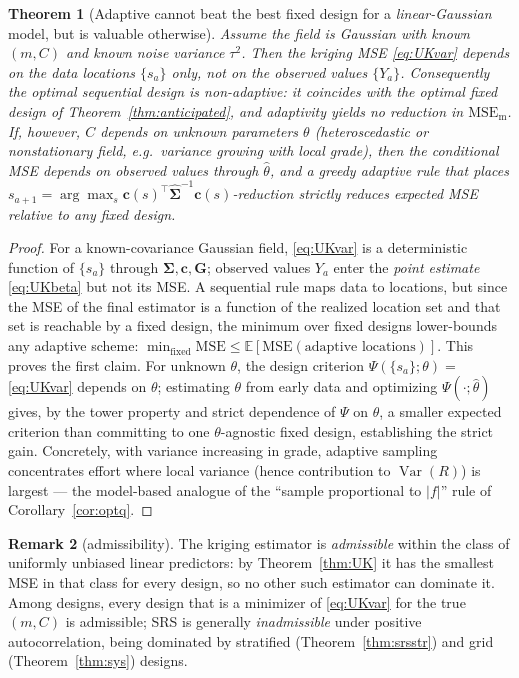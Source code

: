 \documentclass{amsart}
\newtheorem{theorem}{Theorem}
\theoremstyle{definition}
\newtheorem{remark}[theorem]{Remark}
\newcommand{\E}{\mathbb{E}}
\newcommand{\Var}{\operatorname{Var}}
\begin{document}
\begin{theorem}[Adaptive cannot beat the best fixed design for a
\emph{linear-Gaussian} model, but is valuable otherwise]
\label{thm:adaptive}
Assume the field is Gaussian with known $(m,C)$ and known noise variance
$\tau^2$. Then the kriging MSE \eqref{eq:UKvar} depends on the data
locations $\{s_a\}$ \emph{only}, not on the observed values $\{Y_a\}$.
Consequently the optimal sequential design is \emph{non-adaptive}: it
coincides with the optimal fixed design of
Theorem~\ref{thm:anticipated}, and adaptivity yields no reduction in
$\mathrm{MSE}_{\mathrm m}$. If, however, $C$ depends on unknown parameters
$\theta$ (heteroscedastic or nonstationary field, e.g.\ variance growing
with local grade), then the conditional MSE depends on observed values
through $\widehat\theta$, and a greedy adaptive rule that places
$s_{a+1}=\arg\max_{s}\mathbf c(s)^\top\widehat{\boldsymbol\Sigma}^{-1}
\mathbf c(s)$-reduction strictly reduces expected MSE relative to any
fixed design.
\end{theorem}
\begin{proof}
For a known-covariance Gaussian field, \eqref{eq:UKvar} is a deterministic
function of $\{s_a\}$ through $\boldsymbol\Sigma,\mathbf c,\mathbf G$;
observed values $Y_a$ enter the \emph{point estimate} \eqref{eq:UKbeta} but
not its MSE. A sequential rule maps data to locations, but since the MSE of
the final estimator is a function of the realized location set and that set
is reachable by a fixed design, the minimum over fixed designs lower-bounds
any adaptive scheme: $\min_{\text{fixed}}\mathrm{MSE}\le
\E[\mathrm{MSE}(\text{adaptive locations})]$. This proves the first claim.
For unknown $\theta$, the design criterion
$\Psi(\{s_a\};\theta)=$\eqref{eq:UKvar} depends on $\theta$; estimating
$\theta$ from early data and optimizing $\Psi(\cdot;\widehat\theta)$ gives,
by the tower property and strict dependence of $\Psi$ on $\theta$, a
smaller expected criterion than committing to one $\theta$-agnostic fixed
design, establishing the strict gain. Concretely, with variance increasing
in grade, adaptive sampling concentrates effort where local variance (hence
contribution to $\Var(R)$) is largest --- the model-based analogue of the
``sample proportional to $|f|$'' rule of Corollary~\ref{cor:optq}.
\end{proof}

\begin{remark}[admissibility]
The kriging estimator is \emph{admissible} within the class of uniformly
unbiased linear predictors: by Theorem~\ref{thm:UK} it has the smallest MSE
in that class for every design, so no other such estimator can dominate it.
Among designs, every design that is a minimizer of \eqref{eq:UKvar} for the
true $(m,C)$ is admissible; SRS is generally \emph{inadmissible} under
positive autocorrelation, being dominated by stratified
(Theorem~\ref{thm:srsstr}) and grid (Theorem~\ref{thm:sys}) designs.
\end{remark}
\end{document}
